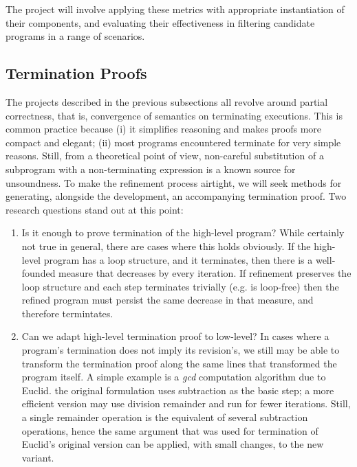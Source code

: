 \bigskip
The project will involve applying these metrics with appropriate 
instantiation of their components, and evaluating their effectiveness
in filtering candidate programs in a range of scenarios.

\subsection{Termination Proofs}

The projects described in the previous subsections all revolve around partial
correctness, that is, convergence of semantics on terminating executions.
This is common practice because
(i) it simplifies reasoning and makes proofs more compact and elegant;
(ii) most programs encountered terminate for very simple reasons.
Still, from a theoretical point of view, non-careful substitution of a subprogram
with a non-terminating expression is a known source for unsoundness.
To make the refinement process airtight, we will seek methods for generating,
alongside the development, an accompanying termination proof.
Two research questions stand out at this point:

\begin{enumerate}
  \item Is it enough to prove termination of the high-level program?
    While certainly not true in general, there are cases where this holds
    obviously. If the high-level program has a loop structure, and it terminates,
    then there is a well-founded measure that decreases by every iteration.
    If refinement preserves the loop structure and each step terminates trivially
    (e.g.  is loop-free) then the refined program must persist the same
    decrease in that measure, and therefore termintates.
  \item Can we adapt high-level termination proof to low-level?
    In cases where a program's termination does not imply its revision's,
    we still may be able to transform the termination proof along the same
    lines that transformed the program itself.
    A simple example is a \textit{gcd} computation algorithm due to Euclid.
    the original formulation uses subtraction as the basic step;
    a more efficient version may use division remainder and run for fewer
    iterations.
    Still, a single remainder operation is the equivalent of several subtraction
    operations, hence the same argument that was used for termination of
    Euclid's original version can be applied, with small changes, to the new variant.
\end{enumerate}

